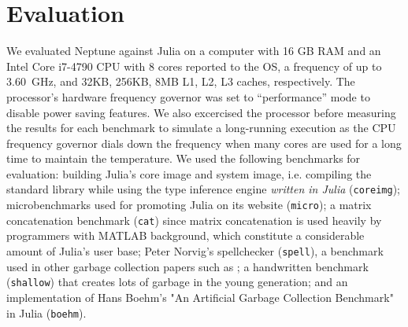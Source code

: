 \section{Evaluation} \label{evaluation}

We evaluated Neptune against Julia on a computer with 16 GB RAM and an Intel Core i7-4790 CPU with 8 cores reported to the OS, a frequency of up to $3.60$~GHz, and 32KB, 256KB, 8MB L1, L2, L3 caches, respectively.
The processor's hardware frequency governor was set to ``performance'' mode to disable power saving features.
We also excercised the processor before measuring the results for each benchmark to simulate a long-running execution as the CPU frequency governor dials down the frequency when many cores are used for a long time to maintain the temperature.
We used the following benchmarks for evaluation: building Julia's core image and system image, i.e. compiling the standard library while using the type inference engine \emph{written in Julia} (\texttt{coreimg}); microbenchmarks used for promoting Julia on its website (\texttt{micro}); a matrix concatenation benchmark (\texttt{cat}) since matrix concatenation is used heavily by programmers with MATLAB background, which constitute a considerable amount of Julia's user base; Peter Norvig's spellchecker (\texttt{spell}), a benchmark used in other garbage collection papers such as \cite{marlow2008parallel}; a handwritten benchmark (\texttt{shallow}) that creates lots of garbage in the young generation; and an implementation of Hans Boehm's "An Artificial Garbage Collection Benchmark" in Julia (\texttt{boehm}).

